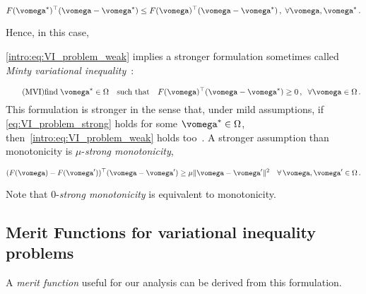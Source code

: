 \begin{equation}
F(\vomega^*)^\top (\vomega - \vomega^*)\leq F(\vomega)^\top (\vomega - \vomega^*) \, , \; \forall \vomega, \vomega^* \,. 
\end{equation}

Hence, in this case,

\eqref{intro:eq:VI_problem_weak} implies a stronger formulation sometimes called \emph{Minty variational inequality}~\citep{crespi2005MVI}:

\begin{equation}\label{eq:VI_problem_strong} \tag{MVI}
\text{find} \; \vomega^* \in \Omega \quad \text{such that} \quad F(\vomega)^\top (\vomega - \vomega^*) \geq 0 \, , \; \;\forall \vomega \in \Omega\,.
\end{equation} This formulation is stronger in the sense that, under mild assumptions, if \eqref{eq:VI_problem_strong} holds for some $\vomega^* \in \Omega$, then~\eqref{intro:eq:VI_problem_weak} holds too~\citep{minty1967generalization}. A stronger assumption than monotonicity is $\mu$-\emph{strong monotonicity}, 

\begin{equation} \label{eq:strong_monotonicity}
(F(\vomega) - F(\vomega'))^\top (\vomega - \vomega') \geq \mu \|\vomega-\vomega'\|^2 \quad \forall\, \vomega,\vomega' \in \Omega \,.
\end{equation} 

Note that $0$-\emph{strong monotonicity} is equivalent to monotonicity.



\subsection{Merit Functions for variational inequality problems}

A \emph{merit function} useful for our analysis can be derived from this formulation. 


